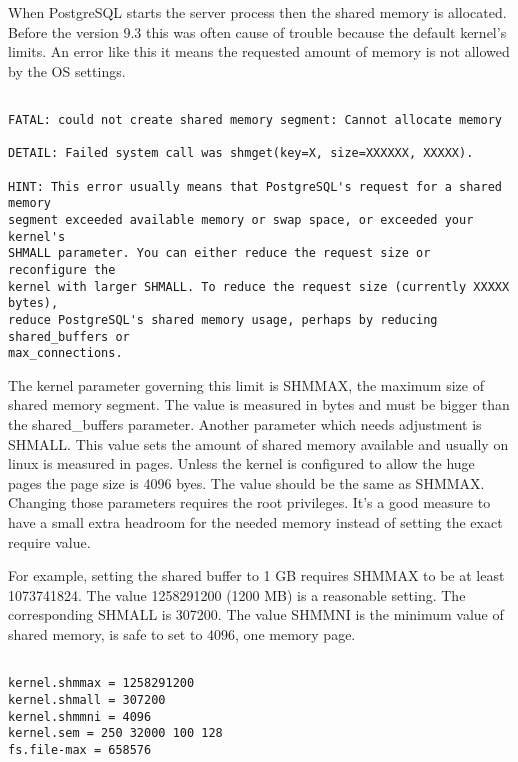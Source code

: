 \label{sec:STARTUP}

When PostgreSQL starts the server process then the shared memory is allocated.
Before the version 9.3 this was often cause of trouble because the default
kernel's limits. An error like this it means the requested amount of memory is
not allowed by the OS settings.

\begin{verbatim}

FATAL: could not create shared memory segment: Cannot allocate memory

DETAIL: Failed system call was shmget(key=X, size=XXXXXX, XXXXX).

HINT: This error usually means that PostgreSQL's request for a shared memory
segment exceeded available memory or swap space, or exceeded your kernel's
SHMALL parameter. You can either reduce the request size or reconfigure the
kernel with larger SHMALL. To reduce the request size (currently XXXXX bytes),
reduce PostgreSQL's shared memory usage, perhaps by reducing shared_buffers or
max_connections.

\end{verbatim}


The kernel parameter governing this limit is SHMMAX, the maximum size of shared
memory segment. The value is measured in bytes and must be bigger than the
shared\_buffers parameter. Another parameter which needs adjustment is SHMALL.
This value sets the amount of shared memory available and usually on linux is
measured in pages. Unless the kernel is configured to allow the huge pages the
page size is 4096 byes. The value should be the same as SHMMAX. Changing those
parameters requires the root privileges. It's a good measure to have a small
extra headroom for the needed memory instead of setting the exact require
value. \newline

For example, setting the shared buffer to 1 GB requires SHMMAX to be at least
1073741824. The value 1258291200 (1200 MB) is a reasonable setting. The
corresponding SHMALL is 307200. The value SHMMNI is the minimum value of shared
memory, is safe to set to 4096, one memory page.

\begin{verbatim}

kernel.shmmax = 1258291200
kernel.shmall = 307200
kernel.shmmni = 4096
kernel.sem = 250 32000 100 128
fs.file-max = 658576

\end{verbatim}

